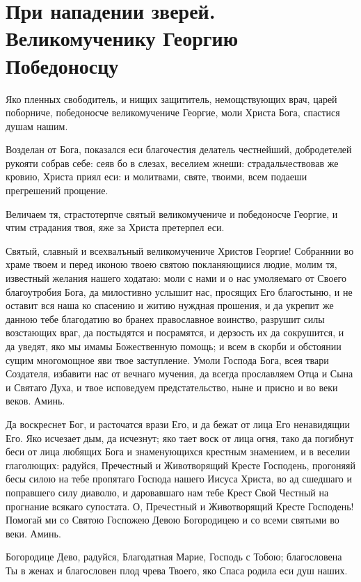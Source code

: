 \mychapterending[1.5]{}


 

\section{При нападении зверей.  Великомученику Георгию Победоносцу}\begin{mymulticols}
 


Яко пленных свободитель, и нищих защититель, немощствующих врач, царей поборниче, победоносче великомучениче Георгие, моли Христа Бога, спастися душам нашим.


Возделан от Бога, показался еси благочестия делатель честнейший, добродетелей рукояти собрав себе: сеяв бо в слезах, веселием жнеши: страдальчествовав же кровию, Христа приял еси: и молитвами, святе, твоими, всем подаеши прегрешений прощение.


Величаем тя, страстотерпче святый великомучениче и победоносче Георгие, и чтим страдания твоя, яже за Христа претерпел еси.


Святый, славный и всехвалъный великомучениче Христов Георгие! Собраннии во храме твоем и перед иконою твоею святою покланяющиися людие, молим тя, известный желания нашего ходатаю: моли с нами и о нас умоляемаго от Своего благоутробия Бога, да милостивно услышит нас, просящих Его благостыню, и не оставит вся наша ко спасению и житию нуждная прошения, и да укрепит же данною тебе благодатию во бранех православное воинство, разрушит силы возстающих враг, да постыдятся и посрамятся, и дерзость их да сокрушится, и да уведят, яко мы имамы Божественную помощь; и всем в скорби и обстоянии сущим многомощное яви твое заступление. Умоли Господа Бога, всея твари Создателя, избавити нас от вечнаго мучения, да всегда прославляем Отца и Сына и Святаго Духа, и твое исповедуем предстательство, ныне и присно и во веки веков. Аминь.

Да воскреснет Бог, и расточатся врази Его, и да бежат от лица Его ненавидящии Его. Яко исчезает дым, да исчезнут; яко тает воск от лица огня, тако да погибнут беси от лица любящих Бога и знаменующихся крестным знамением, и в веселии глаголющих: радуйся, Пречестный и Животворящий Кресте Господень, прогоняяй бесы силою на тебе пропятаго Господа нашего Иисуса Христа, во ад сшедшаго и поправшего силу диаволю, и даровавшаго нам тебе Крест Свой Честный на прогнание всякаго супостата. О, Пречестный и Животворящий Кресте Господень! Помогай ми со Святою Госпожею Девою Богородицею и со всеми святыми во веки. Аминь.

Богородице Дево, радуйся, Благодатная Марие, Господь с Тобою; благословена Ты в женах и благословен плод чрева Твоего, яко Спаса родила еси душ наших.

\end{mymulticols}

